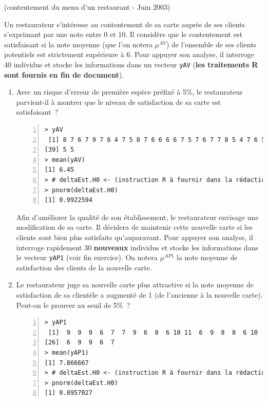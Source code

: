 \documentclass[10pt]{report}
\begin{document}
\begin{exercice} (contentement du menu d'un restaurant - Juin 2003)

Un restaurateur s'int{\'e}resse au contentement de sa carte aupr{\`e}s de ses clients s'exprimant par une note entre 0 et 10. Il consid{\`e}re que le contentement est satisfaisant si la note moyenne  (que l'on notera $\mu^{AV}$) de l'ensemble de ses clients potentiels est strictement sup{\'e}rieure {\`a} 6. Pour appuyer son analyse, il interroge 40 individus et stocke les informations dans un vecteur \texttt{yAV} (\textbf{les traitements R sont fournis en fin de document}).


\begin{enumerate}
\item Avec un risque d'erreur de premi{\`e}re esp{\`e}ce pr{\'e}fix{\'e} {\`a} 5\%, le restaurateur parvient-il {\`a} montrer que le niveau de satisfaction de sa carte est satisfaisant~?

\IndicR
\begin{Verbatim}[frame=leftline,fontfamily=tt,fontshape=n,numbers=left]
> yAV
 [1] 8 7 6 7 9 7 6 4 7 5 8 7 6 6 6 6 7 5 7 6 7 7 8 5 4 7 6 5 7 6 8 6 7 7 7 8 5 8
[39] 5 5
> mean(yAV)
[1] 6.45
> # deltaEst.H0 <- (instruction R à fournir dans la rédaction)
> pnorm(deltaEst.H0)
[1] 0.9922594
\end{Verbatim}

 


Afin d'am{\'e}liorer la qualit{\'e} de son {\'e}tablissement, le restaurateur envisage une modification de sa carte. Il d{\'e}cidera de maintenir cette nouvelle carte si les clients sont bien plus satisfaits qu'auparavant. Pour appuyer son analyse, il interroge rapidement 30 \textbf{nouveaux} individus et stocke les informations dans le vecteur \texttt{yAP1} (voir fin exercice). On notera $\mu^{AP1}$ la note moyenne de satisfaction des clients de la nouvelle carte. 

\item Le restaurateur juge sa nouvelle carte plus attractive si la note moyenne de satisfaction de sa client{\`e}le a augment{\'e} de 1 (de l'ancienne {\`a} la nouvelle carte). Peut-on le prouver au seuil de 5\%~?

\IndicR
\begin{Verbatim}[frame=leftline,fontfamily=tt,fontshape=n,numbers=left]
> yAP1
 [1]  9  9  9  6  7  7  9  6  8  6 10 11  6  9  8  8  6 10  7 10  6  8  7  8  9
[26]  6  9  9  6  7
> mean(yAP1)
[1] 7.866667
> # deltaEst.H0 <- (instruction R à fournir dans la rédaction)
> pnorm(deltaEst.H0)
[1] 0.8957027
\end{Verbatim}


\end{enumerate}
\end{exercice}
\end{document}
